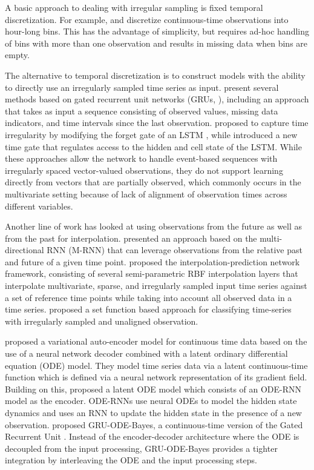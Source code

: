 \documentclass{article} \usepackage{iclr2021_conference,times}
\begin{document}
A basic approach to dealing with irregular sampling is fixed temporal discretization. For example, \citet{marlin-ihi2012} and \citet{lipton2016directly} discretize continuous-time observations into hour-long bins. This has the advantage of simplicity, but requires ad-hoc handling of bins with more than one observation and results in missing data when bins are empty.

The alternative to temporal discretization is to construct models with the ability to directly use
an irregularly sampled time series as input.  \citet{che2016recurrent} present several methods based on  gated recurrent unit networks (GRUs, \citet{gru}), including an approach that takes as input a sequence consisting of observed values, missing data indicators, and time intervals since the last observation. \citet{pham2016} proposed to capture time irregularity by modifying the forget gate of an LSTM \citep{lstm}, while  \citet{phased2016} introduced a new time gate that regulates access to the hidden and cell state of the LSTM. While these approaches allow the network to handle event-based sequences with irregularly spaced vector-valued observations, they do not support learning directly from vectors that are partially observed, which commonly occurs in the multivariate setting because of lack of alignment of observation times across different variables.
 



Another line of work has looked at using observations from the future as well as from the past for interpolation. \citet{Yoon2017,Yoon18} presented an approach based on the multi-directional RNN (M-RNN) that can leverage observations from the relative past and future of a given time point. \citet{shukla2019} proposed the interpolation-prediction network framework, consisting of several semi-parametric RBF interpolation layers that interpolate multivariate, sparse, and irregularly sampled input time series against a set of reference time points while taking into account all observed data in a time series. \citet{seft} proposed a set function based approach for classifying time-series with irregularly sampled and unaligned observation.
 
\citet{neural_ode2018} proposed a variational auto-encoder model \citep{kingma13, rezende14} for continuous time data based on the use of a neural network decoder combined with a latent ordinary differential equation (ODE) model. They model time series data via a latent continuous-time function which is defined via a neural network representation of its gradient field. Building on this, \citet{Rubanova2019} proposed a latent ODE model which consists of an ODE-RNN model as the encoder. ODE-RNNs use neural ODEs to model the  hidden state dynamics and uses an RNN to update the hidden state in the presence of a new observation. \citet{gruodebayes2019} proposed GRU-ODE-Bayes, a continuous-time version of the Gated Recurrent Unit \citep{gru}. Instead of the encoder-decoder architecture where the ODE is decoupled from the input processing, GRU-ODE-Bayes provides a tighter integration by interleaving the ODE and the input processing steps. 
\end{document}
